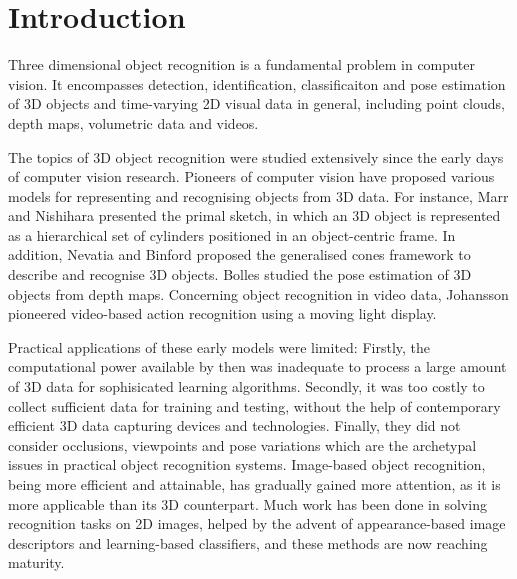 \chapter{Introduction}
\label{chap/intro} 

Three dimensional object recognition is a fundamental problem in computer vision. It encompasses detection, identification, classificaiton and pose estimation of 3D objects and time-varying 2D visual data in general, including point clouds, depth maps, volumetric data and videos. 

The topics of 3D object recognition were studied extensively since the early days of computer vision research. 
Pioneers of computer vision have proposed various models for representing and recognising objects from 3D data.
For instance, Marr and Nishihara \cite{Marr1978} presented the primal sketch, in which an 3D object is represented as a hierarchical set of cylinders positioned in an object-centric frame. 
In addition, Nevatia and Binford \cite{Nevatia1977} proposed the generalised cones framework to describe and recognise 3D objects. Bolles \etal \cite{Bolles1983} studied the pose estimation of 3D objects from depth maps.
Concerning object recognition in video data, Johansson \cite{Johansson1973} pioneered video-based action recognition using a moving light display. 

Practical applications of these early models were limited: Firstly, the computational power available by then was inadequate to process a large amount of 3D data for sophisicated learning algorithms. Secondly, it was too costly to collect sufficient data for training and testing, without the help of contemporary efficient 3D data capturing devices and technologies. Finally, they did not consider occlusions, viewpoints and pose variations which are the archetypal issues in practical object recognition systems. 
Image-based object recognition, being more efficient and attainable, has gradually gained more attention, as it is more applicable than its 3D counterpart. Much work has been done in solving recognition tasks on 2D images, helped by the advent of appearance-based image descriptors and learning-based classifiers, and these methods are now reaching maturity. 

